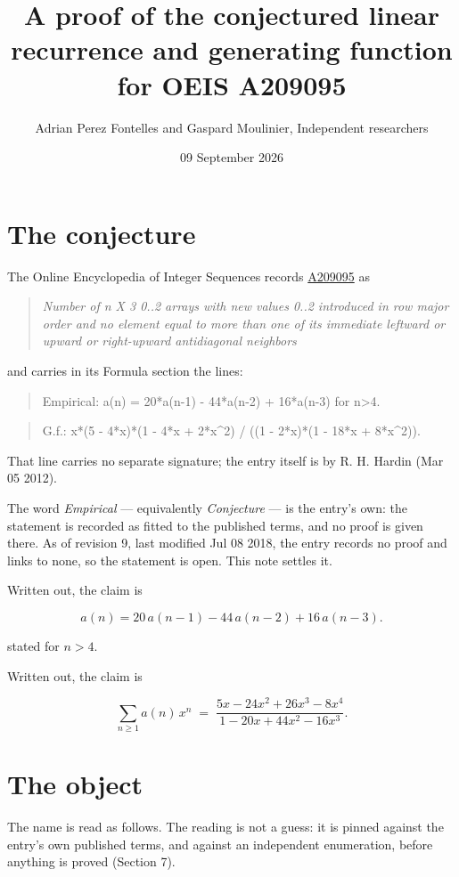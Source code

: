 \documentclass[11pt]{article}
\title{A proof of the conjectured linear recurrence and generating function for OEIS A209095}
\author{Adrian Perez Fontelles and Gaspard Moulinier, Independent researchers}
\date{09 September 2026}
\theoremstyle{definition}
\begin{document}
\maketitle
\section{The conjecture}

The Online Encyclopedia of Integer Sequences records \href{https://oeis.org/A209095}{A209095} as

\begin{quote}\itshape Number of n X 3 0..2 arrays with new values 0..2 introduced in row major order and no element equal to more than one of its immediate leftward or upward or right-upward antidiagonal neighbors\end{quote}

and carries in its Formula section the lines:

\begin{quote}\ttfamily Empirical: a(n) = 20*a(n-1) - 44*a(n-2) + 16*a(n-3) for n>4.\end{quote}

\begin{quote}\ttfamily G.f.: x*(5 - 4*x)*(1 - 4*x + 2*x\textasciicircum{}2) / ((1 - 2*x)*(1 - 18*x + 8*x\textasciicircum{}2)).\end{quote}

That line carries no separate signature; the entry itself is by R. H. Hardin (Mar 05 2012).

The word {\itshape Empirical} --- equivalently {\itshape Conjecture} --- is the entry's own: the statement is recorded as fitted to the published terms, and no proof is given there. As of revision 9, last modified Jul 08 2018, the entry records no proof and links to none, so the statement is open. This note settles it.

Written out, the claim is

\[a(n) = 20\,a(n-1) - 44\,a(n-2) + 16\,a(n-3).\]

stated for $n > 4$.

Written out, the claim is

\[\sum_{n \ge 1} a(n)\,x^n \;=\; \frac{5x - 24x^{2} + 26x^{3} - 8x^{4}}{1 - 20x + 44x^{2} - 16x^{3}}.\]

\section{The object}

The name is read as follows. The reading is not a guess: it is pinned against the entry's own published terms, and against an independent enumeration, before anything is proved (Section 7).
\end{document}
